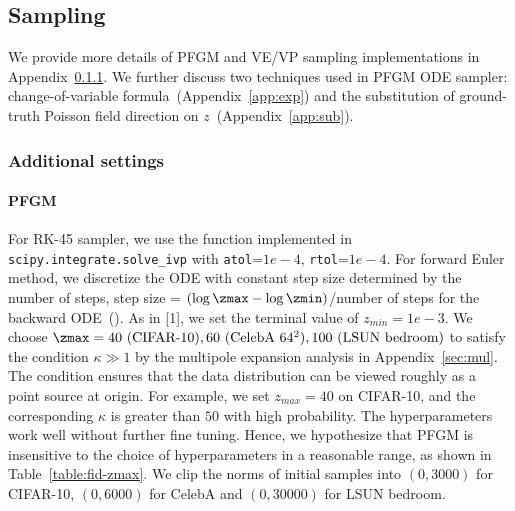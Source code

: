 \subsection{Sampling}
\label{app:sampling}

We provide more details of PFGM and VE/VP sampling implementations in Appendix~\ref{app:sample-add}. We further discuss two techniques used in PFGM ODE sampler: change-of-variable formula~(Appendix~\ref{app:exp}) and the substitution of ground-truth Poisson field direction on $z$~(Appendix~\ref{app:sub}).


\subsubsection{Additional settings}
\label{app:sample-add}
\paragraph{PFGM} For RK-45 sampler, we use the function implemented in \texttt{scipy.integrate.solve\_ivp} with \texttt{atol}=$1e-4$, \texttt{rtol}=$1e-4$. For forward Euler method, we discretize the ODE with constant step size determined by the number of steps, \ie step size = $(\log \zmax - \log \zmin)$/number of steps for the backward ODE~(). {As in [1], we set the terminal value of $z_{min}=1e-3$. We choose $\zmax = 40 \textrm{ (CIFAR-10)},60 \textrm{ (CelebA $64^2$)}, 100\textrm{ (LSUN bedroom)}$ to satisfy the condition $\kappa \gg 1$ by the multipole expansion analysis in Appendix~\ref{sec:mul}. The condition ensures that the data distribution can be viewed roughly as a point source at origin. For example, we set $z_{max}=40$ on CIFAR-10, and the corresponding $\kappa$ is greater than $50$ with high probability. The hyperparameters work well without further fine tuning. Hence, we hypothesize that PFGM is insensitive to the choice of hyperparameters in a reasonable range, as shown in Table~\ref{table:fid-zmax}.} We clip the norms of initial samples into $(0, 3000)$ for CIFAR-10, $(0,6000)$ for CelebA and $(0, 30000)$ for LSUN bedroom.

